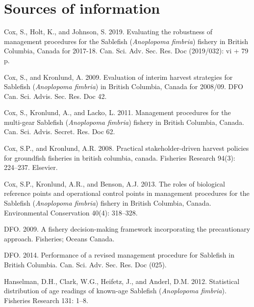 \documentclass[11pt]{book}
\begin{document}
\hypertarget{sources-of-information}{%
\section{Sources of information}\label{sources-of-information}}

\noindent
\vspace{-2em}
\setlength{\parindent}{-0.2in}
\setlength{\leftskip}{0.2in}
\setlength{\parskip}{8pt}

\hypertarget{refs}{}
\leavevmode\hypertarget{ref-cox2019evaluating}{}%
Cox, S., Holt, K., and Johnson, S. 2019. Evaluating the robustness of management procedures for the Sablefish (\emph{Anoplopoma fimbria}) fishery in British Columbia, Canada for 2017-18. Can. Sci. Adv. Sec. Res. Doc (2019/032): vi + 79 p.

\leavevmode\hypertarget{ref-cox2009evaluation}{}%
Cox, S., and Kronlund, A. 2009. Evaluation of interim harvest strategies for Sablefish (\emph{Anoplopoma fimbria}) in British Columbia, Canada for 2008/09. DFO Can. Sci. Advis. Sec. Res. Doc 42.

\leavevmode\hypertarget{ref-cox2011management}{}%
Cox, S., Kronlund, A., and Lacko, L. 2011. Management procedures for the multi-gear Sablefish (\emph{Anoplopoma fimbria}) fishery in British Columbia, Canada. Can. Sci. Advis. Secret. Res. Doc 62.

\leavevmode\hypertarget{ref-cox2008practical}{}%
Cox, S.P., and Kronlund, A.R. 2008. Practical stakeholder-driven harvest policies for groundfish fisheries in british columbia, canada. Fisheries Research 94(3): 224--237. Elsevier.

\leavevmode\hypertarget{ref-cox2013roles}{}%
Cox, S.P., Kronlund, A.R., and Benson, A.J. 2013. The roles of biological reference points and operational control points in management procedures for the Sablefish (\emph{Anoplopoma fimbria}) fishery in British Columbia, Canada. Environmental Conservation 40(4): 318--328.

\leavevmode\hypertarget{ref-DFO2009}{}%
DFO. 2009. A fishery decision-making framework incorporating the precautionary approach. Fisheries; Oceans Canada.

\leavevmode\hypertarget{ref-dfo2014performanc}{}%
DFO. 2014. Performance of a revised management procedure for Sablefish in British Columbia. Can. Sci. Adv. Sec. Res. Doc (025).

\leavevmode\hypertarget{ref-hanselman2012statistical}{}%
Hanselman, D.H., Clark, W.G., Heifetz, J., and Anderl, D.M. 2012. Statistical distribution of age readings of known-age Sablefish (\emph{Anoplopoma fimbria}). Fisheries Research 131: 1--8.
\end{document}
